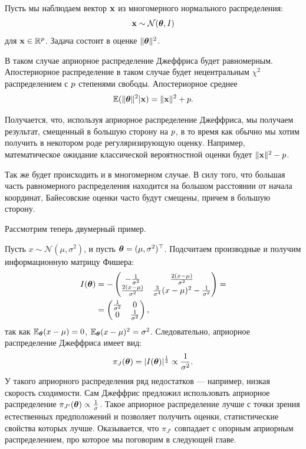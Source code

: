 \begin{example}
Пусть мы наблюдаем вектор $\mathbf{x}$ из многомерного нормального распределения: 
\[
\mathbf{x} \sim \mathcal{N}(\boldsymbol{\theta}, I)
\]
для $\mathbf{x} \in \mathbb{R}^{p}$.
Задача состоит в оценке $\|\boldsymbol{\theta}\|^2$.

В таком случае априорное распределение Джеффриса будет равномерным.
Апостериорное распределение в таком случае будет нецентральным $\chi^2$ распределением с $p$ степенями свободы.
Апостериорное среднее
\[
\mathbb{E} (\|\boldsymbol{\theta} \|^2 | \mathbf{x}) = \|\mathbf{x} \|^2 + p.
\]

Получается, что, используя априорное распределение Джеффриса, мы получаем результат, смещенный в большую сторону на $p$,
в то время как обычно мы хотим получить в некотором роде регуляризирующую оценку.
Например, математическое ожидание классической вероятностной оценки будет $\|\mathbf{x} \|^2 - p$.

Так же будет происходить и в многомерном случае.
В силу того, что большая часть равномерного распределения находится на большом расстоянии от начала координат, 
Байесовские оценки часто будут смещены, причем в большую сторону.
\end{example}

Рассмотрим теперь двумерный пример.
\begin{example}
Пусть $x \sim \mathcal{N}(\mu, \sigma^2)$, и пусть $\boldsymbol{\theta} = (\mu, \sigma^2)^\top$.
Подсчитаем производные и получим информационную матрицу Фишера:
\begin{align*}
I(\boldsymbol{\theta}) &= -
\begin{pmatrix}
-\frac{1}{\sigma^2}           & \frac{2 (x - \mu)}{\sigma^2} \\
\frac{2 (x - \mu)}{\sigma^2} & \frac{3}{\sigma^4} (x - \mu)^2 - \frac{1}{\sigma^2} \\
\end{pmatrix} = \\
&= 
\begin{pmatrix}
\frac{1}{\sigma^2} & 0 \\
0 & \frac{1}{\sigma^2} \\
\end{pmatrix},
\end{align*}
так как $\mathbb{E}_{\boldsymbol{\theta}} (x - \mu) = 0$, $\mathbb{E}_{\boldsymbol{\theta}} (x - \mu)^2 = \sigma^2$.
Следовательно, априорное распределение Джеффриса имеет вид:
\[
\pi_J(\boldsymbol{\theta}) = |I(\boldsymbol{\theta})|^{\frac12} \propto \frac{1}{\sigma^2}.
\]
У такого априорного распределения ряд недостатков --- например, низкая скорость сходимости.
Сам Джеффрис предложил использовать априорное распределение $\pi_{J'}(\boldsymbol{\theta}) \propto \frac{1}{\sigma}$.
Такое априорное распределение лучше с точки зрения естественных предположений и позволяет получить оценки, статистические свойства которых лучше.
Оказывается, что $\pi_{J'}$ совпадает с опорным априорным распределением, про которое мы поговорим в следующей главе.
\end{example}


